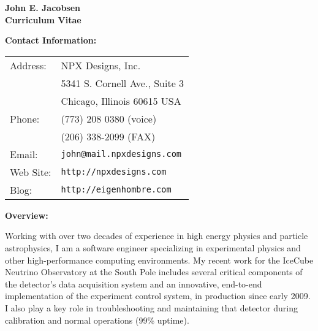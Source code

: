 

\addtolength{\textheight}{1.5in}
\setlength{\voffset}{-0.5in}
\addtolength{\textwidth}{1in}
\setlength{\hoffset}{-0.5in}

\pagestyle{empty}
\parindent=0.0cm
\parskip=0.25cm

\newcommand{\etal}{{\it et.~al.}}
\newcommand{\remember}[1]{{\bf Remember: \{#1\}}}




\begin{center} 
{\Large\bf John E. Jacobsen}\\[0.3cm]
{\bf\Large Curriculum Vitae}
\end{center}
\vspace{1.0cm}


{\bf Contact Information:}

\begin{center}
\begin{tabular}[t]{ll}

Address:   & NPX Designs, Inc. \\
	   & 5341 S. Cornell Ave., Suite 3 \\
	   & Chicago, Illinois 60615 USA\\[0.25cm]

Phone: & (773) 208 0380 (voice) \\
       & (206) 338-2099 (FAX)\\[0.25cm]

Email: & {\tt john@mail.npxdesigns.com}\\
Web Site: & {\tt http://npxdesigns.com }\\
Blog: & {\tt http://eigenhombre.com }

\end{tabular}
\end{center}

\vspace{0.5cm}

{\bf Overview:}

Working with over two decades of experience in high energy physics and particle astrophysics, I am a software engineer specializing in experimental physics and other high-performance computing environments.  My recent work for the IceCube Neutrino Observatory at the South Pole includes several critical components of the detector's data acquisition system and an innovative, end-to-end implementation of the experiment control system, in production since early 2009.  I also play a key role in troubleshooting and maintaining that detector during calibration and normal operations (99\% uptime).

